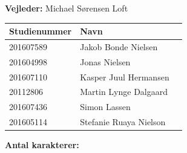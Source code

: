 \begin{center}
	\textbf{Vejleder:} Michael Sørensen Loft\\
	\vspace{5pt}
	\begin{tabular}{|l|l|l|}
		\hline
		\rowcolor{gray!50}
		\textbf{Studienummer} & \textbf{Navn}\\ [5px]
		\hline
		201607589 & Jakob Bonde Nielsen\\
		\hline
		201604998 & Jonas Nielsen\\
		\hline
		201607110 & Kasper Juul Hermansen\\
		\hline
		20112806 & Martin Lynge Dalgaard\\
		\hline
		201607436 & Simon Lassen\\
		\hline
		201605114 & Stefanie Ruaya Nielson\\
		\hline
	\end{tabular}

	\ifdefined\frontpageCharacters
		\vspace{10pt}
		\textbf{Antal karakterer: } \frontpageCharacters\\
	\fi
	\vspace{30pt}

\end{center}
